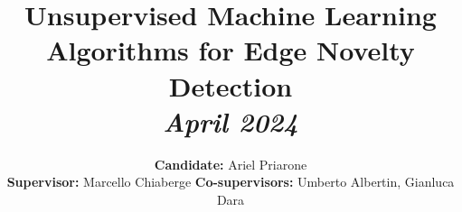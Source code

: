 \documentclass[a4paper, 10pt, conference, oneside]{ieeeconf}      %
\title{{\LARGE \bf
Unsupervised Machine Learning Algorithms for Edge Novelty Detection} \\ \normalsize \vspace*{5pt} \textit{April 2024}
}
\author{\textbf{Candidate:} Ariel Priarone \\
\textbf{Supervisor:} Marcello Chiaberge 
\textbf{Co-supervisors:} Umberto Albertin, Gianluca Dara%
}
\date{\vspace{-\baselineskip}}
\begin{document}
\maketitle
\thispagestyle{empty}
\pagestyle{empty}

\begin{abstract}

\end{abstract}






\end{document}
